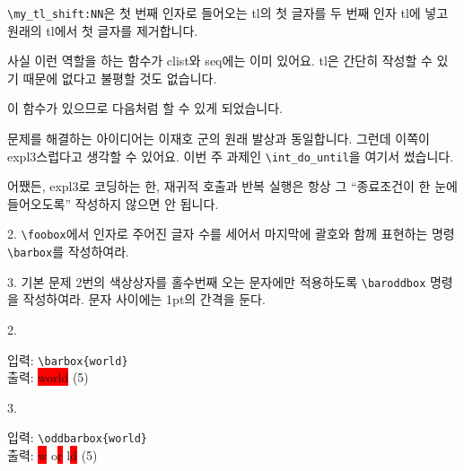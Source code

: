 \documentclass[a4paper,amsmath]{oblivoir}
\begin{document}
\verb|\my_tl_shift:NN|은 첫 번째 인자로 들어오는 tl의 첫 글자를 두 번째 인자 tl에 넣고 원래의 tl에서 첫 글자를 제거합니다.

\medskip
{}사실 이런 역할을 하는 함수가 clist와 seq에는 이미 있어요. tl은 간단히 작성할 수 있기 때문에 없다고 불평할 것도 없습니다.

\medskip 

이 함수가 있으므로 다음처럼 할 수 있게 되었습니다.

문제를 해결하는 아이디어는 이재호 군의 원래 발상과 동일합니다. 그런데 이쪽이 expl3스럽다고 생각할 수 있어요. 이번 주 과제인 \verb|\int_do_until|을 여기서 썼습니다.

어쨌든, expl3로 코딩하는 한, 재귀적 호출과 반복 실행은 항상 그 “종료조건이 한 눈에 들어오도록” 작성하지 않으면 안 됩니다.

\newpage

\begin{questionp}
 2. \verb|\foobox|에서 인자로 주어진 글자 수를 세어서 마지막에 괄호와 함께 표현하는 명령 \verb|\barbox|를 작성하여라.

\bigskip

 3. 기본 문제 2번의 색상상자를 홀수번째 오는 문자에만 적용하도록 \verb|\baroddbox| 명령을 작성하여라. 문자 사이에는 1pt의 간격을 둔다.
\tcblower

\smallskip

2. \begin{minipage}[t]{\dimexpr\textwidth-3em\relax}
입력: \verb|\barbox{world}| \\
출력: \colorbox{red}{\color{yellow}w}\hskip1pt\colorbox{red}{\color{yellow}o}\hskip1pt\colorbox{red}{\color{yellow}r}\hskip1pt\colorbox{red}{\color{yellow}l}\hskip1pt\colorbox{red}{\color{yellow}d} (5)
\end{minipage}

\smallskip

3. \begin{minipage}[t]{\dimexpr\textwidth-3em\relax}
입력: \verb|\oddbarbox{world}| \\
출력: \colorbox{red}{\color{yellow}w}\hskip1pt o\hskip1pt\colorbox{red}{\color{yellow}r}\hskip1pt l\hskip1pt\colorbox{red}{\color{yellow}d} (5)
\end{minipage}
\end{questionp}
\end{document}
